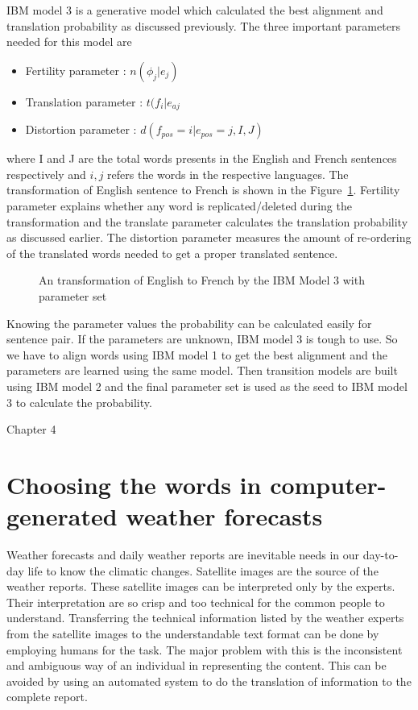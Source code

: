 \documentclass{bmcart}
\begin{document}
IBM model 3 is a generative model which calculated the best alignment and translation probability as discussed previously. The three important parameters needed for this model are
\begin{itemize}
\item Fertility parameter : $n(\phi_j |e _j)$
\item Translation parameter : $t(f_i | e_{aj}$
\item Distortion parameter : $d(f_{pos}=i | e_{pos} = j, I,J)$ 
\end{itemize}
where I and J are the total words presents in the English and French sentences respectively and $i,j$ refers the words in the respective languages. The transformation of English sentence to French is shown in the Figure~\ref{fig:mtExample2}. Fertility parameter explains whether any word is replicated/deleted during the transformation and the translate parameter calculates the translation probability as discussed earlier. The distortion parameter measures the amount of re-ordering of the translated words needed to get a proper translated sentence.

\begin{figure}[h!tb]
\centering
{}
\caption{An transformation of English to French by the IBM Model 3 with  parameter set}
\label{fig:mtExample2}
\end{figure}

Knowing the parameter values the probability can be calculated easily for sentence pair. If the parameters are unknown, IBM model 3 is tough to use. So we have to align words using IBM model 1 to get the best alignment and  the parameters are learned using the same model. Then transition models are built using IBM model 2 and the final parameter set is used as the seed to IBM model 3 to calculate the probability.
\clearpage 

\begin{center}
\huge{Chapter 4}
\end{center} 

\section{Choosing the words in computer-generated weather forecasts}
\label{sec:introPaper}

Weather forecasts and daily weather reports are inevitable needs in our day-to-day life to know the climatic changes. Satellite images are the source of the weather reports. These satellite images can be interpreted only by the experts. Their interpretation are so crisp and too technical for the common people to understand. Transferring the technical information listed by the weather experts from the satellite images to the understandable text format can be done by employing humans for the task. The major problem with this is the inconsistent and ambiguous way of an individual in representing the content. This can be avoided by using an automated system to do the translation of information to the complete report.  
\end{document}
